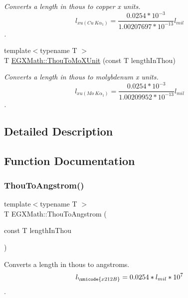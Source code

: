 \begin{DoxyCompactItemize}
\begin{DoxyCompactList}\small\item\em Converts a length in thous to copper x units. \[ l_{xu(Cu\ K\alpha_1)}=\frac{0.0254 * 10^{-3}}{1.00207697*10^{-13}} l_{mil}\]. \end{DoxyCompactList}\item 
{\footnotesize template$<$typename T $>$ }\\T \mbox{\hyperlink{group___e_g_x_math-_conversions-_length_conversions-_imperial-_thou-_non-_s_i_ga3eb765800fa51e529878bdae4e997763}{E\+G\+X\+Math\+::\+Thou\+To\+Mo\+X\+Unit}} (const T length\+In\+Thou)
\begin{DoxyCompactList}\small\item\em Converts a length in thous to molybdenum x units. \[ l_{xu(Mo\ K\alpha_1)}=\frac{0.0254 * 10^{-3}}{1.00209952*10^{-13}} l_{mil}\]. \end{DoxyCompactList}\end{DoxyCompactItemize}


\subsection{Detailed Description}


\subsection{Function Documentation}
\mbox{\label{group___e_g_x_math-_conversions-_length_conversions-_imperial-_thou-_non-_s_i_ga5d852bdec8556e4b6bde1445f5f74a20}} 
\subsubsection{\texorpdfstring{Thou\+To\+Angstrom()}{ThouToAngstrom()}}
{\footnotesize\ttfamily template$<$typename T $>$ \\
T E\+G\+X\+Math\+::\+Thou\+To\+Angstrom (\begin{DoxyParamCaption}\item[{const T}]{length\+In\+Thou }\end{DoxyParamCaption})}



Converts a length in thous to angstroms. \[ l_{\unicode{x212B}}=0.0254 * l_{mil} * 10^{7} \]. 

